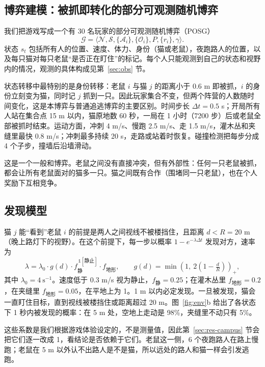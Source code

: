 \documentclass[a4paper,zihao=5,fontset=fandol,UTF8]{ctexart}
\begin{document}
\subsection{博弈建模：被抓即转化的部分可观测随机博弈}
我们把游戏写成一个有 30 名玩家的部分可观测随机博弈（POSG）
\begin{equation*}
\mathcal{G}=\langle \mathcal{N}, \mathcal{S}, \{\mathcal{A}_i\}, \{\mathcal{O}_i\}, P, \{r_i\}, \gamma\rangle .
\end{equation*}
状态 $s_t$ 包括所有人的位置、速度、体力、身份（猫或老鼠），夜跑路人的位置，以及每只猫对每只老鼠“是否正在盯住”的标记。每个人只能观测到自己的状态和视野内的情况，观测的具体构成见第~\ref{sec:obs} 节。

状态转移中最特别的是身份转移：老鼠 $i$ 与猫 $j$ 的距离小于 0.6 m 即被抓，$i$ 的身份立刻变为猫，同时记 $j$ 抓到一只。因此玩家集合不变，但两个阵营的人数随时间变化，这是本博弈与普通追逃博弈的主要区别。时间步长 $\Delta t=0.5$ s；开局所有人站在集合点 15 m 以内，猫原地数 60 秒，一局在 1 小时（7200 步）后或老鼠全部被抓时结束。运动方面，冲刺 4 m/s、慢跑 2.5 m/s、走 1.5 m/s，灌木丛和夹缝里最快 0.8 m/s；冲刺最多持续 20 s，走路或站着时恢复。碰撞检测把每步分成 4 个子步，撞墙后沿墙滑动。

这是一个一般和博弈。老鼠之间没有直接冲突，但有外部性：任何一只老鼠被抓，都会让所有老鼠面对的猫多一只。猫之间既有合作（围堵同一只老鼠），也在个人奖励下互相竞争。

\subsection{发现模型}
\label{sec:detect}
猫 $j$ 能“看到”老鼠 $i$ 的前提是两人之间视线不被楼挡住，且距离 $d<R=20$ m（晚上路灯下的视野）。在这个前提下，每一步以概率 $1-e^{-\lambda\Delta t}$ 发现对方，速率为
\begin{equation}
\lambda = \lambda_0 \cdot g(d) \cdot f_{\text{静}}^{\,\mathbb{1}[\text{静止}]} \cdot f_{\text{地形}}, \qquad
g(d)=\min\!\left(1,\ 2\left(1-\tfrac{d}{R}\right)\right)_{+},
\end{equation}
其中 $\lambda_0=4\ \text{s}^{-1}$。速度低于 0.3 m/s 视为静止，$f_{\text{静}}=0.25$；在灌木丛里 $f_{\text{地形}}=0.2$，在夹缝里 $f_{\text{地形}}=0.05$，在平地上为 1。1 m 以内必定发现。一旦被发现，猫会一直盯住目标，直到视线被楼挡住或距离超过 20 m。图~\ref{fig:env}b 给出了各状态下 1 秒内被发现的概率：在 5 m 处，空地上走动是 98\%，夹缝里不动只有 5\%。

这些系数是我们根据游戏体验设定的，不是测量值，因此第~\ref{sec:res-campus} 节会把它们逐一改成 1，看结论是否依赖于它们。老鼠这一侧，6 个夜跑路人在路上慢跑；老鼠在 5 m 以外认不出路人是不是猫，所以远处的路人和猫一样会引发逃跑。
\end{document}
